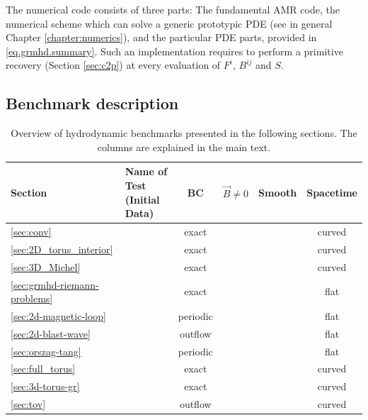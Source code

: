 The numerical code consists of three parts: The fundamental AMR code,
the numerical scheme which can solve a generic prototypic PDE
(see in general Chapter \ref{chapter:numerics}), and the particular PDE
parts, provided in \ref{eq.grmhd.summary}. Such an implementation requires
to perform a primitive recovery (Section \ref{sec:c2p}) at every evaluation
of $F^i$, $B^{ij}$ and $S$. 

\subsection{Benchmark description}
\newcommand{\yes}{\cmark}
\newcommand{\no}{\xmark}
\begin{table}[t]
	\begin{tabularx}{\textwidth}{lXcccc}
		\toprule
		Section & Name of Test (Initial Data)
		& BC
		& $\vec B \neq 0$ & Smooth & 
		Spacetime \\
		\midrule
		\ref{sec:conv} & \nameref{sec:conv} & exact & \no & \yes & curved \\
		\ref{sec:2D_torus_interior} & \nameref{sec:2D_torus_interior} & exact & 
		\no & \yes & curved \\
		\ref{sec:3D_Michel} & \nameref{sec:3D_Michel} & exact & \yes & \yes & 
		curved \\
		\ref{sec:grmhd-riemann-problems} & \nameref{sec:grmhd-riemann-problems} 
		& exact & \yes & \no & flat \\
		\ref{sec:2d-magnetic-loop} & \nameref{sec:2d-magnetic-loop} & periodic 
		& \no & \no & flat \\
		\ref{sec:2d-blast-wave} & \nameref{sec:2d-blast-wave} & outflow & \no & 
		\no & flat  \\
		\ref{sec:orszag-tang} & \nameref{sec:orszag-tang} & periodic & \no & 
		\no & flat \\
		\ref{sec:full_torus} & \nameref{sec:full_torus} & exact & \yes & \no & 
		curved \\
		\ref{sec:3d-torus-gr} & \nameref{sec:3d-torus-gr} & exact & \yes & \no 
		& curved \\
		\ref{sec:tov} & \nameref{sec:tov} & outflow & \yes & \no & curved \\
		\bottomrule
	\end{tabularx}
	\caption[
	  Overview of hydrodynamic benchmarks presented in chapter 
	  \ref{chapter:hydro}
	]{Overview of hydrodynamic benchmarks presented in the following
		sections. The columns are explained in the main text.
     }%
	\label{table:benchmark-overview}
\end{table}

